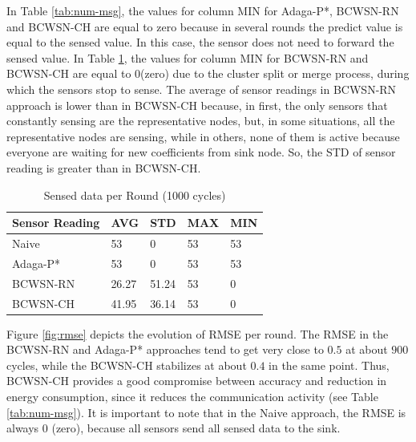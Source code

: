 \documentclass[conference]{IEEEtran}
\begin{document}
In Table \ref{tab:num-msg}, the values for column MIN for Adaga-P*, BCWSN-RN and
BCWSN-CH are equal to zero because in several rounds the predict value is equal
to the sensed value. In this case, the sensor does not need to forward the
sensed value. In Table \ref{tab:sens-read}, the values for column MIN for
BCWSN-RN and BCWSN-CH are equal to 0(zero) due to the cluster split or merge
process, during which the sensors stop to sense. The average of sensor readings
in BCWSN-RN approach is lower than in BCWSN-CH because, in first, the only
sensors that constantly sensing are the representative nodes, but, in some
situations, all the representative nodes are sensing, while in others, none of
them is active because everyone are waiting for new coefficients from sink node.
So, the STD of sensor reading is greater than in BCWSN-CH.


\begin{table}[h!]
\caption{Sensed data per Round (1000 cycles)}
\label{tab:sens-read}
\begin{center}
\begin{tabular}{|l||l|l|l|l|}
\hline
Sensor Reading &AVG &STD &MAX &MIN \\
\hline\hline
Naive &53 &0 &53 &53 \\
\hline
Adaga-P* &53 &0 &53 &53 \\
\hline
BCWSN-RN &26.27 &51.24 &53 &0 \\
\hline
BCWSN-CH &41.95 &36.14 &53 &0 \\
\hline
\end{tabular}
\end{center}
\end{table}


Figure \ref{fig:rmse} depicts the evolution of RMSE per round. The RMSE in the
BCWSN-RN and Adaga-P* approaches tend to get very close to $0.5$ at about $900$
cycles, while the BCWSN-CH stabilizes at about $0.4$ in the same point. Thus,
BCWSN-CH provides a good compromise between accuracy and reduction in energy
consumption, since it reduces the communication activity (see Table
\ref{tab:num-msg}). It is important to note that in the Naive approach, the RMSE
is always 0 (zero), because all sensors send all sensed data to the sink.
\end{document}
